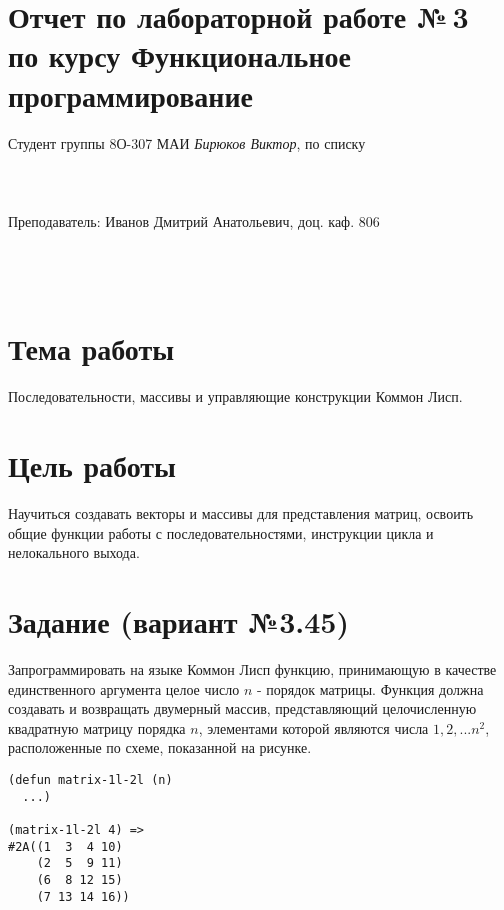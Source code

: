 \documentclass[12pt]{article}
\begin{document}
\section*{Отчет по лабораторной работе №\,3 \\
по курсу \guillemotleft  Функциональное программирование\guillemotright}
\begin{flushright}
Студент группы 8О-307 МАИ \textit{Бирюков Виктор},  по списку \\
 \\
 \\
\ \\
Преподаватель: Иванов Дмитрий Анатольевич, доц. каф. 806 \\
 \\
 \\
 \\

\end{flushright}

\section{Тема работы}
Последовательности, массивы и управляющие конструкции Коммон Лисп.

\section{Цель работы}
Научиться создавать векторы и массивы для представления матриц, освоить общие функции работы с последовательностями, инструкции цикла и нелокального выхода.

\section{Задание (вариант №3.45)}
Запрограммировать на языке Коммон Лисп функцию, принимающую в качестве единственного аргумента целое число $n$ - порядок матрицы. Функция должна создавать и возвращать двумерный массив, представляющий целочисленную квадратную матрицу порядка $n$, элементами которой являются числа $1, 2, ... n^2$, расположенные по схеме, показанной на рисунке.

\begin{lstlisting}
(defun matrix-1l-2l (n)
  ...)

(matrix-1l-2l 4) =>
#2A((1  3  4 10)
    (2  5  9 11)
    (6  8 12 15)
    (7 13 14 16))
\end{lstlisting}
\end{document}
